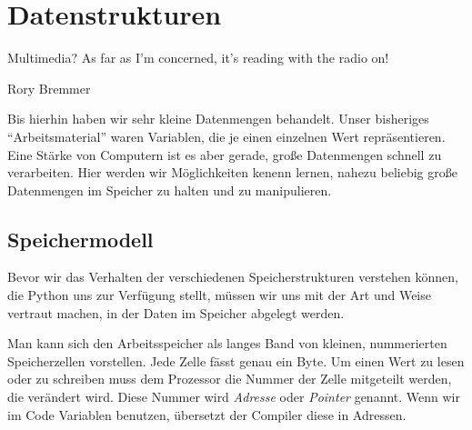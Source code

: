 \chapter{Datenstrukturen}
\label{chp:Containers}
\epigraph{
	Multimedia? As far as I'm concerned, it's reading with the radio on!
}{Rory Bremmer}

Bis hierhin haben wir sehr kleine Datenmengen behandelt. Unser bisheriges \enquote{Arbeitsmaterial} waren
Variablen, die je einen einzelnen Wert repräsentieren. Eine Stärke von Computern ist es aber gerade, große
Datenmengen schnell zu verarbeiten. Hier werden wir Möglichkeiten kenenn lernen, nahezu beliebig
große Datenmengen im Speicher zu halten und zu manipulieren.

\section{Speichermodell}
\label{sec:MemoryModel}
Bevor wir das Verhalten der verschiedenen Speicherstrukturen verstehen können, die Python uns zur Verfügung stellt, müssen wir uns mit der Art und Weise vertraut machen, in der Daten im Speicher abgelegt werden.

Man kann sich den Arbeitsspeicher als langes Band von kleinen, nummerierten Speicherzellen vorstellen. Jede Zelle fässt genau ein Byte. Um einen Wert zu lesen oder zu schreiben muss dem Prozessor die Nummer der Zelle mitgeteilt werden, die verändert wird. Diese Nummer wird \emph{Adresse} oder \emph{Pointer} genannt. Wenn wir im Code Variablen benutzen, übersetzt der Compiler diese in Adressen. 

